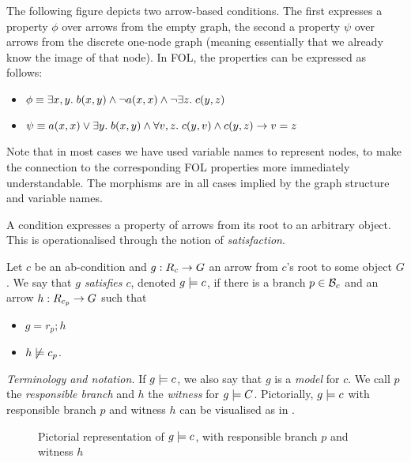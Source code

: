 \begin{example}
The following figure depicts two arrow-based conditions. The first expresses a property $\phi$ over arrows from the empty graph, the second a property $\psi$ over arrows from the discrete one-node graph (meaning essentially that we already know the image of that node). In FOL, the properties can be expressed as follows:
\begin{itemize}
\item $\phi\equiv \exists x,y.\; b(x,y) \wedge \neg a(x,x)\wedge \neg \exists z.\; c(y,z)$
\item $\psi\equiv a(x,x)\vee \exists y.\; b(x,y) \wedge \forall v,z.\; c(y,v)\wedge c(y,z) \rightarrow v=z$
\end{itemize}
Note that in most cases we have used variable names to represent nodes, to make the connection to the corresponding FOL properties more immediately understandable. The morphisms are in all cases implied by the graph structure and variable names.
\begin{center}

\end{center}
\end{example}
%
A condition expresses a property of arrows from its root to an arbitrary object. This is operationalised through the notion of \emph{satisfaction}.

\begin{definition}
  Let $c$ be an ab-condition and $g:R_c\rightarrow G$ an arrow from $c$'s root to some object $G$. We say that \emph{$g$ satisfies $c$}, denoted $g\models c$, if there is a branch $p\in \mathcal{B}_c$ and an arrow $h:R_{c_p}\rightarrow G$ such that
  \begin{itemize}
  \item $g=r_p;h$
  \item $h\not\models c_p$.
  \end{itemize}
\end{definition}
%
\emph{Terminology and notation.} If $g\models c$, we also say that $g$ is a \emph{model} for $c$. We call $p$ the \emph{responsible branch} and $h$ the \emph{witness} for $g\models C$. Pictorially, $g\models c$ with responsible branch $p$ and witness $h$ can be visualised as in .
%
\begin{figure}
  \centering
  
  \caption{Pictorial representation of $g\models c$, with responsible branch $p$ and witness $h$}
\end{figure}

